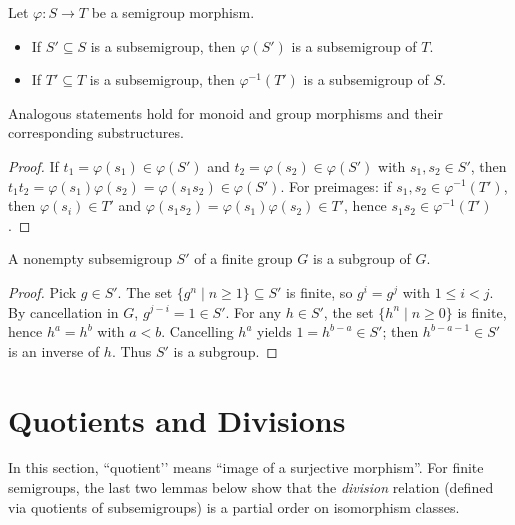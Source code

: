 \begin{lemma}
\label{lem:morphism-preserves-substructures}
Let \(\varphi:S\to T\) be a semigroup morphism.
\begin{itemize}
  \item If \(S'\subseteq S\) is a subsemigroup, then \(\varphi(S')\) is a subsemigroup of \(T\).
  \item If \(T'\subseteq T\) is a subsemigroup, then \(\varphi^{-1}(T')\) is a subsemigroup of \(S\).
\end{itemize}
Analogous statements hold for monoid and group morphisms and their corresponding substructures.
\end{lemma}
\begin{proof}
If \(t_1=\varphi(s_1)\in \varphi(S')\) and \(t_2=\varphi(s_2)\in \varphi(S')\) with \(s_1,s_2\in S'\), then \(t_1t_2=\varphi(s_1)\varphi(s_2)=\varphi(s_1s_2)\in\varphi(S')\). For preimages: if \(s_1,s_2\in \varphi^{-1}(T')\), then \(\varphi(s_i)\in T'\) and \(\varphi(s_1s_2)=\varphi(s_1)\varphi(s_2)\in T'\), hence \(s_1s_2\in \varphi^{-1}(T')\).
\end{proof}

\begin{lemma}
\label{lem:finite-group-subsemigroup-is-subgroup}
A nonempty subsemigroup \(S'\) of a finite group \(G\) is a subgroup of \(G\).
\end{lemma}
\begin{proof}
Pick \(g\in S'\). The set \(\{g^n\mid n\ge 1\}\subseteq S'\) is finite, so \(g^i=g^j\) with \(1\le i<j\). By cancellation in \(G\), \(g^{j-i}=1\in S'\). For any \(h\in S'\), the set \(\{h^n\mid n\ge 0\}\) is finite, hence \(h^a=h^b\) with \(a<b\). Cancelling \(h^a\) yields \(1=h^{b-a}\in S'\); then \(h^{b-a-1}\in S'\) is an inverse of \(h\). Thus \(S'\) is a subgroup.
\end{proof}

\section {Quotients and Divisions}

\noindent
In this section, “quotient’’ means “image of a surjective morphism”. For finite semigroups, the last two lemmas below show that the \emph{division} relation (defined via quotients of subsemigroups) is a partial order on isomorphism classes.

